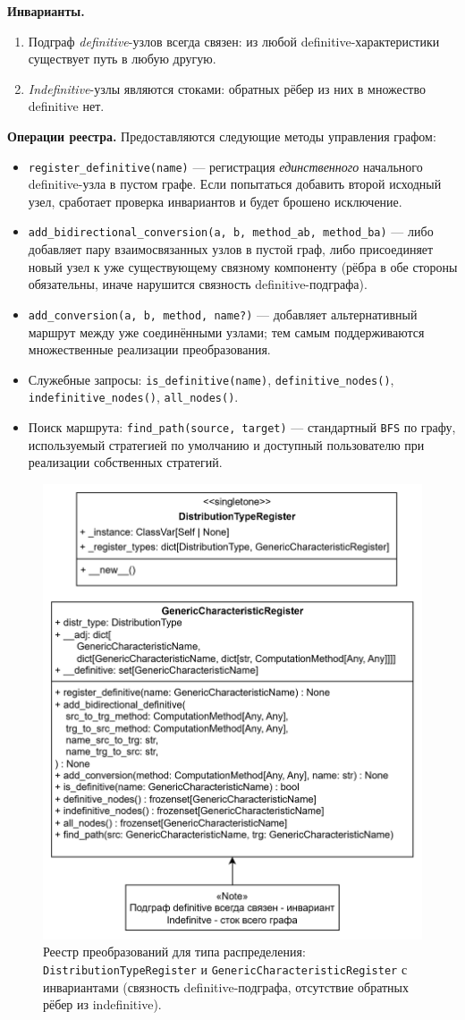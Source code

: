 \textbf{Инварианты.}
\begin{enumerate}
  \item Подграф \emph{definitive}-узлов всегда связен: из любой definitive-характеристики существует путь в любую другую.
  \item \emph{Indefinitive}-узлы являются стоками: обратных рёбер из них в множество definitive нет.
\end{enumerate}

\textbf{Операции реестра.}
Предоставляются следующие методы управления графом:
\begin{itemize}
  \item \texttt{register\_definitive(name)} — регистрация \emph{единственного} начального definitive-узла в пустом графе. Если попытаться добавить второй исходный узел, сработает проверка инвариантов и будет брошено исключение.
  \item \texttt{add\_bidirectional\_conversion(a, b, method\_ab, method\_ba)} — либо добавляет пару взаимосвязанных узлов в пустой граф, либо присоединяет новый узел к уже существующему связному компоненту (рёбра в обе стороны обязательны, иначе нарушится связность definitive-подграфа).
  \item \texttt{add\_conversion(a, b, method, name?)} — добавляет альтернативный маршрут между уже соединёнными узлами; тем самым поддерживаются множественные реализации преобразования.
  \item Служебные запросы: \texttt{is\_definitive(name)}, \texttt{definitive\_nodes()}, \texttt{indefinitive\_nodes()}, \texttt{all\_nodes()}.
  \item Поиск маршрута: \texttt{find\_path(source, target)} — стандартный \texttt{BFS} по графу, используемый стратегией по умолчанию и доступный пользователю при реализации собственных стратегий.
\end{itemize}

\begin{figure}[h]
  \centering
  \includegraphics[width=.5\linewidth,trim=4mm 4mm 4mm 4mm,clip]{assets/images/Register.png}
  \caption{Реестр преобразований для типа распределения: \texttt{DistributionTypeRegister}
  и \texttt{GenericCharacteristicRegister} с инвариантами (связность definitive-подграфа,
  отсутствие обратных рёбер из indefinitive).}
  \label{fig:uml-register}
\end{figure}